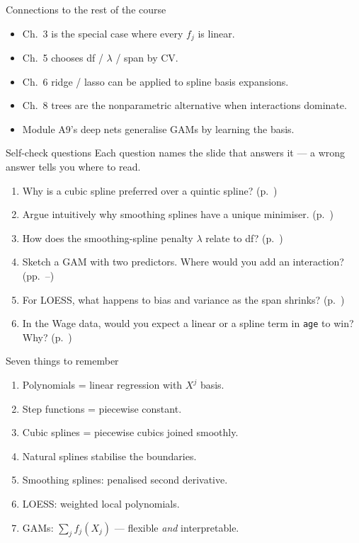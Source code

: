 \documentclass[aspectratio=169,11pt]{beamer}
\begin{document}
\begin{frame}{Connections to the rest of the course}
  \begin{itemize}
    \item Ch.~3 is the special case where every $f_j$ is linear.
    \item Ch.~5 chooses df / $\lambda$ / span by CV.
    \item Ch.~6 ridge / lasso can be applied to spline basis
          expansions.
    \item Ch.~8 trees are the nonparametric alternative when
          interactions dominate.
    \item Module A9's deep nets generalise GAMs by learning the basis.
  \end{itemize}
\end{frame}

\begin{frame}{Self-check questions}
  Each question names the slide that answers it --- a wrong answer tells you
  where to read.
  \begin{enumerate}
    \item Why is a cubic spline preferred over a quintic spline?
          (p.~\pageref{frm:knots})
    \item Argue intuitively why smoothing splines have a unique
          minimiser. (p.~\pageref{frm:smoothobj})
    \item How does the smoothing-spline penalty $\lambda$ relate to df?
          (p.~\pageref{frm:smoothread})
    \item Sketch a GAM with two predictors. Where would you add an
          interaction? (pp.~\pageref{frm:gam}--\pageref{frm:gamwhy})
    \item For LOESS, what happens to bias and variance as the span
          shrinks? (p.~\pageref{frm:loess})
    \item In the Wage data, would you expect a linear or a spline term
          in \texttt{age} to win? Why? (p.~\pageref{frm:gamwage})
  \end{enumerate}
\end{frame}

\begin{frame}{Seven things to remember}
  \begin{enumerate}
    \item Polynomials = linear regression with $X^j$ basis.
    \item Step functions = piecewise constant.
    \item Cubic splines = piecewise cubics joined smoothly.
    \item Natural splines stabilise the boundaries.
    \item Smoothing splines: penalised second derivative.
    \item LOESS: weighted local polynomials.
    \item GAMs: $\sum_j f_j(X_j)$ --- flexible \emph{and} interpretable.
  \end{enumerate}
\end{frame}
\end{document}
